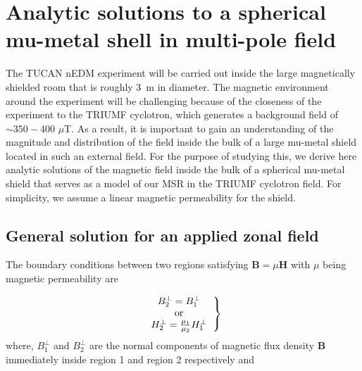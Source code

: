 
\chapter{Analytic solutions to a spherical mu-metal shell in multi-pole field}

The TUCAN nEDM experiment will be carried out inside the large magnetically shielded room that is roughly 3~m in diameter.  The magnetic environment around the experiment will be challenging because of the closeness of the experiment to the TRIUMF cyclotron, which generates a background field of $\sim 350 - 400$ $\mu$T.
As a result, it is important to gain an understanding of the magnitude and distribution of the field inside  the bulk of a large mu-metal shield located in such an external field. For the purpose of studying this, we derive here analytic solutions of the magnetic field inside the bulk of a spherical mu-metal shield that serves as a model of our MSR in the TRIUMF cyclotron field.  For simplicity, we assume a linear magnetic permeability for the shield.


\section{General solution for an applied zonal field}
The boundary conditions between two regions satisfying $\bm{B}=\mu \bm{H}$ with $\mu$ being  magnetic permeability are


\begin{equation}\label{b1}   
\left.
  \begin{tabular}{ccc}
  $B_2^\bot=B_1^\bot$\\
  or \\
  $H_2^\bot=\frac{\mu_{1}}{\mu_{2}}H_1^\bot$
  \end{tabular}
 \right\}
\end{equation}
where, $B_1^\bot$ and $B_2^\bot$ are the normal components of magnetic flux density $\bm{B}$ immediately inside region 1 and region 2 respectively and

